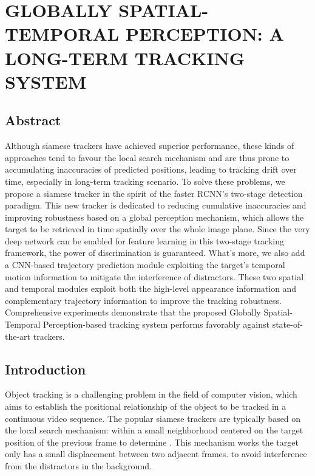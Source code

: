 \chapter{GLOBALLY SPATIAL-TEMPORAL PERCEPTION: A LONG-TERM TRACKING SYSTEM}\label{chap:globally}

\section{Abstract}
Although siamese trackers have achieved superior performance, these kinds of approaches tend to favour the local search mechanism and are thus prone to accumulating inaccuracies of predicted positions, leading to tracking drift over time, especially in long-term tracking scenario. To solve these problems, we propose a siamese tracker in the spirit of the faster RCNN's two-stage detection paradigm. This new tracker is dedicated to reducing cumulative inaccuracies and improving robustness based on a global perception mechanism, which allows the target to be retrieved in time spatially over the whole image plane. Since the very deep network can be enabled for feature learning in this two-stage tracking framework, the power of discrimination is guaranteed. What's more, we also add a CNN-based trajectory prediction module exploiting the target's temporal motion information to mitigate the interference of distractors.
These two spatial and temporal modules exploit both the high-level appearance information and complementary trajectory information to improve the tracking robustness. Comprehensive experiments demonstrate that the proposed Globally Spatial-Temporal Perception-based tracking system performs favorably against state-of-the-art trackers.

\section{Introduction}
\label{sec:intro}

Object tracking \cite{Leang2018OnlineFO, Wang2019VisualOT, Zhang2018UsingFL} is a challenging problem in the field of computer vision, which aims to establish the positional relationship of the object to be tracked in a continuous video sequence.
The popular siamese trackers \cite{bertinetto2016fully, li2018high, Wang2018SiamMask} are typically based on the local search mechanism:  within a small neighborhood centered on the target position of the previous frame to determine .
This mechanism works  the target only has a small displacement between two adjacent frames.
 to avoid interference from the distractors in the background.

